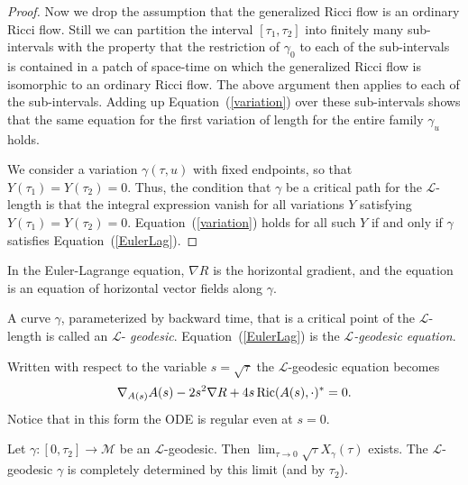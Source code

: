 \begin{proof}
Now we drop the assumption that the generalized Ricci flow is an
ordinary Ricci flow. Still we can partition the interval
$[\tau_1,\tau_2]$ into finitely many sub-intervals with the property
that the restriction of $\gamma_0$ to each of the sub-intervals is
contained in a patch of space-time on which the generalized Ricci
flow is isomorphic to an ordinary Ricci flow. The above argument
then applies to each of the sub-intervals. Adding up
Equation~(\ref{variation}) over these sub-intervals shows that the
same equation for the first variation of length for the entire
family $\gamma_u$ holds.


We consider a variation $\gamma(\tau,u)$ with fixed endpoints, so
that  $Y(\tau_{1})=Y(\tau_{2})= 0.$ Thus, the condition that
$\gamma$ be a critical path for the ${\mathcal L}$-length is that
the integral expression vanish for all variations $Y$ satisfying
$Y(\tau_1)=Y(\tau_2)=0$. Equation~(\ref{variation}) holds for all
such $Y$ if and only if $\gamma$ satisfies
Equation~(\ref{EulerLag}).
\end{proof}

\begin{remark}\label{rem:horizontal-gradient-convention}

In the Euler-Lagrange equation, $\nabla R$ is the horizontal
gradient, and the equation is an equation of horizontal vector
fields along $\gamma$.
\end{remark}

\begin{definition}\label{def:l-geodesic}

A curve $\gamma$, parameterized by backward time, that is a critical
point of the ${\mathcal L}$-length is called an $\mathcal{L}$-{\em
geodesic}.
Equation~(\ref{EulerLag}) is the {\em ${\mathcal L}$-geodesic
equation}.
\end{definition}


Written with respect to the variable $s=\sqrt{\tau}$ the
$\mathcal{L}$-geodesic equation becomes
\begin{equation}\label{reparam}
\nabla_{A(s)}A(s) -2s^{2}\nabla R + 4s\operatorname{Ric}(A(s),\cdot)^*=0.\end{equation}
 Notice that in this form the ODE is
regular even at $s=0$.



\begin{lemma}\label{lem:l-geodesic-initial-limit}

Let $\gamma\colon [0,\tau_2]\to {\mathcal M}$ be an ${\mathcal L}$-geodesic.
Then $\lim_{\tau\rightarrow 0}\sqrt{\tau}X_\gamma(\tau)$ exists. The
${\mathcal L}$-geodesic $\gamma$ is completely determined by this limit (and by
$\tau_2$).
\end{lemma}

